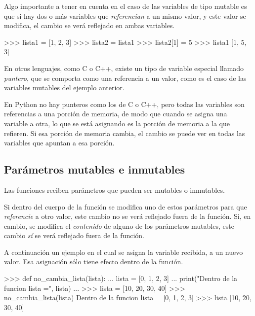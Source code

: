 Algo importante a tener en cuenta en el caso de las variables de tipo
mutable es que si hay dos o más variables que \textit{referencian} a un mismo
valor, y este valor se modifica, el cambio se verá reflejado en ambas variables.

\begin{codigo-python-sn}
>>> lista1 = [1, 2, 3]
>>> lista2 = lista1
>>> lista2[1] = 5
>>> lista1
[1, 5, 3]
\end{codigo-python-sn}

\begin{sabias_que}
En otros lenguajes, como C o C++, existe un tipo de variable especial
llamado \emph{puntero}, que se comporta como una referencia a un valor,
como es el caso de las variables mutables del ejemplo anterior.

En Python no hay punteros como los de C o C++, pero todas las variables son
referencias a una porción de memoria, de modo que cuando se asigna una
variable a otra, lo que se está asignando es la porción de memoria a la que
refieren.  Si esa porción de memoria cambia, el cambio se puede ver en
todas las variables que apuntan a esa porción.
\end{sabias_que}


\subsection{Parámetros mutables e inmutables}

Las funciones reciben parámetros que pueden ser mutables o inmutables.

Si dentro del cuerpo de la función se modifica uno de estos parámetros para
que \textit{referencie} a otro valor, este cambio no se verá reflejado fuera de la
función.  Si, en cambio, se modifica el \textit{contenido} de alguno de los
parámetros mutables, este cambio \textit{sí} se verá reflejado fuera de la
función.

A continuación un ejemplo en el cual se asigna la variable recibida, a un
nuevo valor.  Esa asignación sólo tiene efecto dentro de la función.

\begin{codigo-python-sn}
>>> def no_cambia_lista(lista):
...     lista = [0, 1, 2, 3]
...     print("Dentro de la funcion lista =", lista)
...
>>> lista = [10, 20, 30, 40]
>>> no_cambia_lista(lista)
Dentro de la funcion lista = [0, 1, 2, 3]
>>> lista
[10, 20, 30, 40]
\end{codigo-python-sn}

